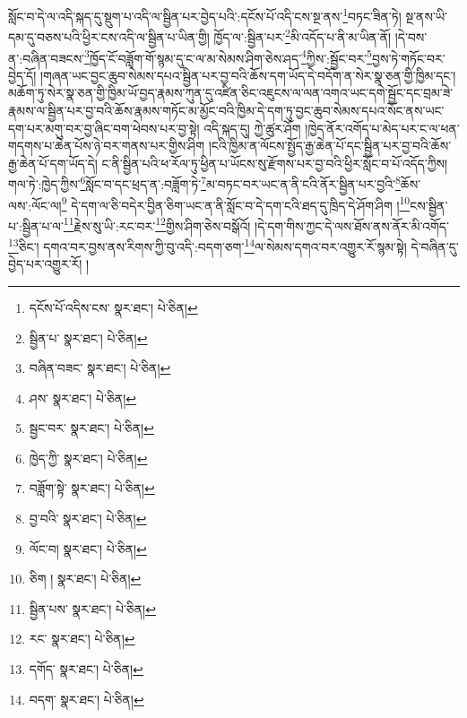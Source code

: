 སློང་བ་དེ་ལ་འདི་སྐད་དུ་སྡུག་པ་འདི་ལ་སྦྱིན་པར་བྱེད་པའི་:དངོས་པོ་འདི་ངས་སྔ་ནས་\footnote{དངོས་པོ་འདིས་ངས་  སྣར་ཐང་།  པེ་ཅིན། }བཏང་ཟིན་ཏེ། སྔ་ནས་ཡི་དམ་དུ་བཅས་པའི་ཕྱིར་ངས་འདི་ལ་སྦྱིན་པ་ཡིན་གྱི། ཁྱོད་ལ་:སྦྱིན་པར་\footnote{སྦྱིན་པ་  སྣར་ཐང་།  པེ་ཅིན། }མི་འདོད་པ་ནི་མ་ཡིན་ནོ། །དེ་བས་ན་:བཞིན་བཟངས་\footnote{བཞིན་བཟང་  སྣར་ཐང་།  པེ་ཅིན། }ཁྱོད་ངོ་བཟློག་གོ་སྙམ་དུ་ང་ལ་མ་སེམས་ཤིག་ཅེས་ཤད་\footnote{ཤས་  སྣར་ཐང་།  པེ་ཅིན། }ཀྱིས་:སྦྱོང་བར་\footnote{སྦྱང་བར་  སྣར་ཐང་།  པེ་ཅིན། }བྱས་ཏེ་གཏོང་བར་བྱེད་དོ། །གཞན་ཡང་བྱང་ཆུབ་སེམས་དཔའ་སྦྱིན་པར་བྱ་བའི་ཆོས་དག་ཡོད་དེ་བདོག་ན་སེར་སྣ་ཅན་གྱི་ཁྱིམ་དང་། མཆོག་ཏུ་སེར་སྣ་ཅན་གྱི་ཁྱིམ་ཡོ་བྱད་རྣམས་ཀུན་དུ་འཛིན་ཅིང་འཇུངས་ལ་ལན་འགའ་ཡང་དགེ་སྦྱོང་དང་བྲམ་ཟེ་རྣམས་ལ་སྦྱིན་པར་བྱ་བའི་ཆོས་རྣམས་གཏོང་མ་མྱོང་བའི་ཁྱིམ་དེ་དག་ཏུ་བྱང་ཆུབ་སེམས་དཔའ་སོང་ནས་ཡང་དག་པར་མགུ་བར་བྱ་ཞིང་བག་ཕེབས་པར་བྱ་སྟེ། འདི་སྐད་དུ། ཀྱེ་ཚུར་ཤོག །ཁྱེད་ནོར་འགོད་པ་མེད་པར་ང་ལ་ཕན་གདགས་པ་ཆེན་པོས་ཉེ་བར་གནས་པར་གྱིས་ཤིག །ངའི་ཁྱིམ་ན་ལོངས་སྤྱོད་རྒྱ་ཆེན་པོ་དང་སྦྱིན་པར་བྱ་བའི་ཆོས་རྒྱ་ཆེན་པོ་དག་ཡོད་དེ། ང་ནི་སྦྱིན་པའི་ཕ་རོལ་ཏུ་ཕྱིན་པ་ཡོངས་སུ་རྫོགས་པར་བྱ་བའི་ཕྱིར་སློང་བ་པོ་འདོད་ཀྱིས། གལ་ཏེ་:ཁྱེད་ཀྱིས་\footnote{ཁྱེད་ཀྱི་  སྣར་ཐང་།  པེ་ཅིན། }སློང་བ་དང་ཕྲད་ན་:བཟློག་ཏེ་\footnote{བཟློག་སྟེ་  སྣར་ཐང་།  པེ་ཅིན། }མ་བཏང་བར་ཡང་ན་ནི་ངའི་ནོར་སྦྱིན་པར་བྱའི་\footnote{བྱ་བའི་  སྣར་ཐང་།  པེ་ཅིན། }ཆོས་ལས་:ལོང་ལ།\footnote{ལོང་བ།  སྣར་ཐང་།  པེ་ཅིན། } དེ་དག་ལ་ཅི་བདེར་བྱིན་ཅིག་ཡང་ན་ནི་སློང་བ་དེ་དག་ངའི་ཐད་དུ་ཁྲིད་དེ་ཤོག་ཤིག །\footnote{ཅིག །  སྣར་ཐང་།  པེ་ཅིན། }ངས་སྦྱིན་པ་:སྦྱིན་པ་ལ་\footnote{སྦྱིན་པས་  སྣར་ཐང་།  པེ་ཅིན། }རྗེས་སུ་ཡི་:རང་བར་\footnote{རང་  སྣར་ཐང་།  པེ་ཅིན། }གྱིས་ཤིག་ཅེས་བསྒོའོ། །དེ་དག་གིས་ཀྱང་དེ་ལས་ཐོས་ནས་ནོར་མི་འགོད་\footnote{དགོད་  སྣར་ཐང་།  པེ་ཅིན། }ཅིང་། དགའ་བར་བྱས་ནས་རིགས་ཀྱི་བུ་འདི་:བདག་ཅག་\footnote{བདག་  སྣར་ཐང་།  པེ་ཅིན། }ལ་སེམས་དགའ་བར་འགྱུར་རོ་སྙམ་སྟེ། དེ་བཞིན་དུ་བྱེད་པར་འགྱུར་རོ། །
